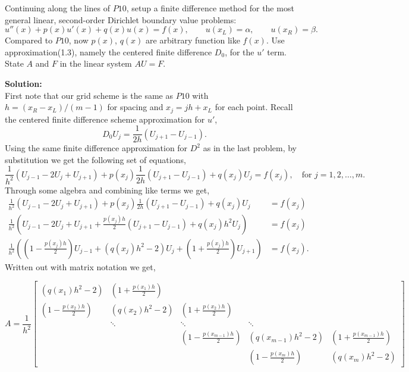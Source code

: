 \documentclass[12pt]{article}
\makeatletter
\theoremstyle{homework}
\newenvironment{exercise}[1]
{\def\@currentlabel{#1}\exercisecore}
{\endexercisecore}
\newcommand{\localhead}[1]{\par\smallskip\noindent\textbf{#1}\nobreak\\}%
\newcommand\solution{\localhead{Solution:}}
\makeatother
\begin{document}
\begin{exercise}{Problem P11} Continuing along the lines of $P10$, setup a finite difference method for 
  the most general linear, second-order Dirichlet boundary value problems:
  \begin{equation*}
    u''(x) + p(x)u'(x) + q(x)u(x) = f(x), \qquad u(x_L) = \alpha, \qquad u(x_R) = \beta.
  \end{equation*}
  Compared to $P10$, now $p(x)$, $q(x)$ are arbitrary function like $f(x)$. Use approximation(1.3), 
  namely the centered finite difference $D_0$, for the $u'$ term. State $A$ and $F$ in the linear system $AU = F$.
  \solution First note that our grid scheme is the same as $P10$ with $h = (x_R - x_L)/(m - 1)$ for spacing and $x_j = jh + x_L$ for each point. 
  Recall the centered finite difference scheme approximation for $u'$,   
  \begin{equation*}
    D_0U_j = \frac{1}{2h}\left(U_{j + 1} - U_{j - 1}\right).
  \end{equation*}
  Using the same finite difference approximation for $D^2$ as in the last problem, by substitution we get the following set of equations, 
  \begin{equation*}
    \frac{1}{h^2}\left(U_{j - 1} -2U_j + U_{j + 1}\right) + p(x_j)\frac{1}{2h}\left(U_{j + 1} - U_{j - 1}\right) + q(x_j)U_j = f(x_j), \quad \text{for } j = 1, 2,\dots, m.
  \end{equation*}
  Through some algebra and combining like terms we get, 
  \begin{align*}
    \frac{1}{h^2}\left(U_{j - 1} -2U_j + U_{j + 1}\right) + p(x_j)\frac{1}{2h}\left(U_{j + 1} - U_{j - 1}\right) + q(x_j)U_j &= f(x_j)\\
    \frac{1}{h^2}\left(U_{j - 1} -2U_j + U_{j + 1} + \frac{p(x_j)h}{2}\left(U_{j + 1} - U_{j - 1}\right) + q(x_j)h^2U_j\right) &= f(x_j)\\
    \frac{1}{h^2} \left( \left(1 - \frac{p(x_j)h}{2}\right)U_{j-1} + \left(q(x_j)h^2 - 2\right)U_j + \left(1 + \frac{p(x_j)h}{2}\right)U_{j+1} \right) &= f(x_j).
  \end{align*}
  Written out with matrix notation we get, 
  
  \begin{equation*}
    A = \frac{1}{h^2}
    \begin{bmatrix}
         (q(x_1)h^2 - 2) &   \left(1 + \frac{p(x_1)h}{2}\right)    &         &         &                  \\
         \left(1 - \frac{p(x_2)h}{2}\right)   & (q(x_2)h^2 - 2) &    \left(1 + \frac{p(x_2)h}{2}\right)   &         &                  \\ 
                 &    \ddots    & \ddots &    \ddots    &            \\ 
                          &         &      \left(1 - \frac{p(x_{m - 1})h}{2}\right)    & (q(x_{m-1})h^2 - 2)  &   \left(1 + \frac{p(x_{m - 1})h}{2}\right)     \\
                          &         &         &      \left(1 - \frac{p(x_m)h}{2}\right)    & (q(x_m)h^2 - 2) 
    \end{bmatrix}
  \end{equation*}



\end{exercise}
\end{document}
